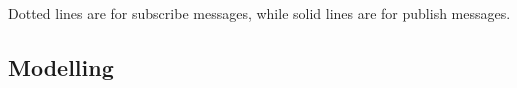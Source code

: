 \documentclass{scrartcl}
\begin{document}
Dotted lines are for subscribe messages, while solid lines are for publish messages. \newline

\subsection{Modelling}\label{modelling}





\end{document}
